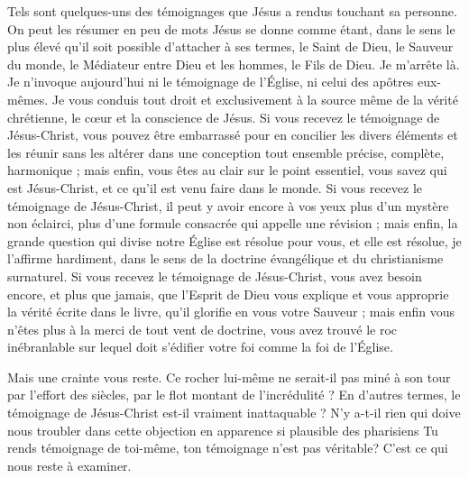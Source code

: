 Tels sont quelques-uns des témoignages que Jésus a rendus touchant sa personne. On peut les résumer en peu de mots\frcolon{} Jésus se donne comme étant, dans le sens le plus élevé qu’il soit possible d’attacher à ses termes, le Saint de Dieu, le Sauveur du monde, le Médiateur entre Dieu et les hommes, le Fils de Dieu.
Je m’arrête là. Je n’invoque aujourd’hui ni le témoignage de l’Église, ni celui des apôtres eux-mêmes. Je vous conduis tout droit et exclusivement à la source même de la vérité chrétienne, le cœur et la conscience de Jésus.
Si vous recevez le témoignage de Jésus-Christ, vous pouvez être embarrassé pour en concilier les divers éléments et les réunir sans les altérer dans une conception tout ensemble précise, complète, harmonique ; mais enfin, vous êtes au clair sur le point essentiel, vous savez qui est Jésus-Christ, et ce qu’il est venu faire dans le monde. Si vous recevez le témoignage de Jésus-Christ, il peut y avoir encore à vos yeux plus d’un mystère non éclairci, plus d’une formule consacrée qui appelle une révision ; mais enfin, la grande question qui divise notre Église est résolue pour vous, et elle est résolue, je l’affirme hardiment, dans le sens de la doctrine évangélique et du christianisme surnaturel. Si vous recevez le témoignage de Jésus-Christ, vous avez besoin encore, et plus que jamais, que l’Esprit de Dieu vous explique et vous approprie la vérité écrite dans le livre, qu’il glorifie en vous votre Sauveur ; mais enfin vous n’êtes plus à la merci de tout vent de doctrine, vous avez trouvé le roc inébranlable sur lequel doit s’édifier votre foi comme la foi de l’Église.

Mais une crainte vous reste. Ce rocher lui-même ne serait-il pas miné à son tour par l’effort des siècles, par le flot montant de l’incrédulité ? En d’autres termes, le témoignage de Jésus-Christ est-il vraiment inattaquable ? N’y a-t-il rien qui doive nous troubler dans cette objection en apparence si plausible des pharisiens\frcolon{} \Og{} Tu rends témoignage de toi-même, ton témoignage n’est pas véritable\Fg{}?
C’est ce qui nous reste à examiner.

